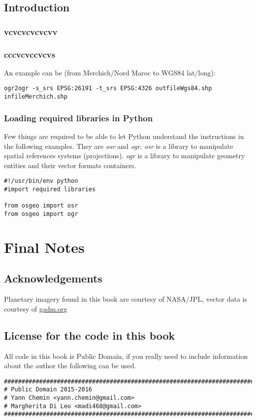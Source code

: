 \documentclass[10pt]{book}
\begin{document}
\section{Introduction}
\subsection{vcvcvcvcvcvv}
\subsection{cccvcvccvcvs}


\noindent An example can be (from Merchich/Nord Maroc to WGS84 lat/long):

\begin{verbatim}
ogr2ogr -s_srs EPSG:26191 -t_srs EPSG:4326 outfileWgs84.shp infileMerchich.shp
\end{verbatim}

\subsection{Loading required libraries in Python}
Few things are required to be able to let Python understand the instructions in the following examples. 
They are {\it osr} and {\it ogr}. {\it osr} is a library to manipulate spatial references systems (projections).
{\it ogr} is a library to manipulate geometry entities and their vector formats containers.

\begin{verbatim}
#!/usr/bin/env python
#import required libraries

from osgeo import osr
from osgeo import ogr
\end{verbatim}

\newpage

\newpage
\chapter{Final Notes}

\newpage
\section{Acknowledgements}
Planetary imagery found in this book are courtesy of NASA/JPL, vector data is courtesy of \href{http:/gadm.org}{gadm.org}
\section{License for the code in this book}
All code in this book is Public Domain, if you really need to include information about the author 
the following can be used.
\begin{verbatim}
###############################################################################
# Public Domain 2015-2016
# Yann Chemin <yann.chemin@gmail.com>
# Margherita Di Leo <madi468@gmail.com>
###############################################################################
\end{verbatim}
\end{document}
